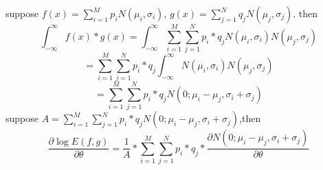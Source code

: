 \documentclass{article}
\begin{document}
suppose $f(x) = \sum_{i=1}^{M}p_iN(\mu_i,\sigma_i)$,
$g(x) = \sum_{j=1}^{N}q_jN(\mu_j,\sigma_j)$.\newline
then 
	\begin{equation}
	\int_{-\infty}^{\infty}{f(x)*g(x)} = 
	\int_{-\infty}^{\infty}{\sum_{i=1}^{M}\sum_{j=1}^{N}p_i*q_jN(\mu_i,\sigma_i)N(\mu_j,\sigma_j)}
	\end{equation}
	\begin{equation}
	=\sum_{i=1}^{M}\sum_{j=1}^{N}p_i*q_j\int_{-\infty}
	^{\infty}N(\mu_i,\sigma_i)N(\mu_j,\sigma_j)
	\end{equation}
	\begin{equation}
	=\sum_{i=1}^{M}\sum_{j=1}^{N}p_i*q_jN(0;\mu_i-\mu_j,\sigma_i+\sigma_j)
	\end{equation}
suppose $A = \sum_{i=1}^{M}\sum_{j=1}^{N}p_i*q_jN(0;\mu_i-\mu_j,\sigma_i+\sigma_j)$,then
	\begin{equation}
	\frac{\partial{\log{E(f,g)}}}{\partial{\theta}} = \frac{1}{A}
	*\sum_{i=1}^{M}\sum_{j=1}^{N}p_i*q_j * \frac{\partial{N(0;\mu_i-\mu_j,\sigma_i+\sigma_j)}}{\partial{\theta}}
	\end{equation}
\end{document}
